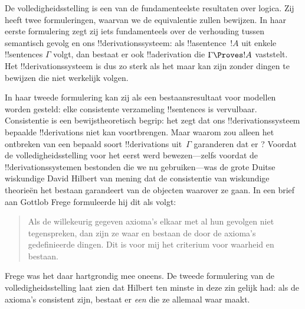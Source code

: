 \documentclass[openany]{memoir}
\begin{document}
\begingroup
\def\olfilename{OLP-0127}
\def\olfilepath{content/first-order-logic/completeness/}
\hypertarget{unit-OLP-0127}{}



      {}
      {}


De volledigheidsstelling is een van de fundamenteelste resultaten over
logica. Zij heeft twee formuleringen, waarvan we de equivalentie zullen
bewijzen. In haar eerste formulering zegt zij iets fundamenteels over
de verhouding tussen semantisch gevolg en ons !!{derivation}ssysteem:
als !!a{sentence}~$!A$ uit enkele !!{sentence}s $\Gamma$ volgt, dan
bestaat er ook !!a{derivation} die $\Gamma \Proves !A$ vaststelt. Het
!!{derivation}ssysteem is dus zo sterk als het maar kan zijn zonder
dingen te bewijzen die niet werkelijk volgen.

In haar tweede formulering kan zij als een bestaansresultaat voor
modellen worden gesteld: elke consistente verzameling !!{sentence}s is
vervulbaar. Consistentie is een bewijstheoretisch begrip: het zegt dat
ons !!{derivation}ssysteem bepaalde !!{derivation}s niet kan
voortbrengen. Maar waarom zou alleen het ontbreken van een bepaald
soort !!{derivation}s uit~$\Gamma$ garanderen dat er
? Voordat de
volledigheidsstelling voor het eerst werd bewezen---zelfs voordat de
!!{derivation}ssystemen bestonden die we nu gebruiken---was de grote
Duitse wiskundige David Hilbert van mening dat de consistentie van
wiskundige theorieën het bestaan garandeert van de objecten waarover
ze gaan. In een brief aan Gottlob Frege formuleerde hij dit als volgt:
\begin{quote}
  Als de willekeurig gegeven axioma's elkaar met al hun gevolgen niet
  tegenspreken, dan zijn ze waar en bestaan de door de axioma's
  gedefinieerde dingen. Dit is voor mij het criterium voor waarheid en
  bestaan.
\end{quote}
Frege was het daar hartgrondig mee oneens. De tweede formulering van de
volledigheidsstelling laat zien dat Hilbert ten minste in deze zin
gelijk had: als de axioma's consistent zijn, bestaat er \emph{een}
 die ze allemaal waar maakt.
\end{document}
